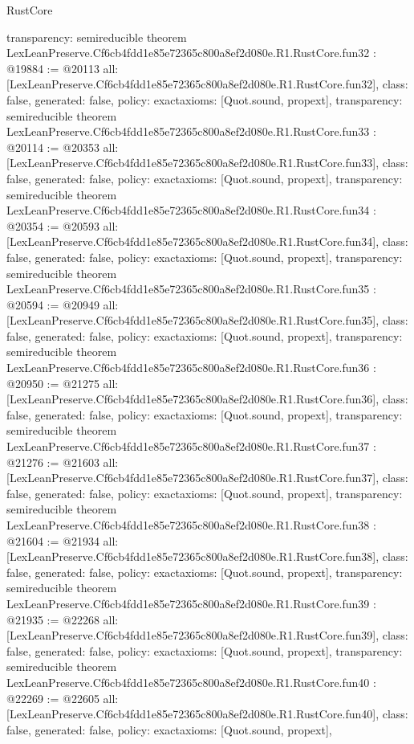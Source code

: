\begin{lexlean}{RustCore}
\begin{coremodule}
{  transparency: semireducible
}
theorem LexLeanPreserve.Cf6cb4fdd1e85e72365c800a8ef2d080e.R1.RustCore.fun32 : @19884 := @20113 {
  all: [LexLeanPreserve.Cf6cb4fdd1e85e72365c800a8ef2d080e.R1.RustCore.fun32],
  class: false,
  generated: false,
  policy: exact{axioms: [Quot.sound, propext]},
  transparency: semireducible
}
theorem LexLeanPreserve.Cf6cb4fdd1e85e72365c800a8ef2d080e.R1.RustCore.fun33 : @20114 := @20353 {
  all: [LexLeanPreserve.Cf6cb4fdd1e85e72365c800a8ef2d080e.R1.RustCore.fun33],
  class: false,
  generated: false,
  policy: exact{axioms: [Quot.sound, propext]},
  transparency: semireducible
}
theorem LexLeanPreserve.Cf6cb4fdd1e85e72365c800a8ef2d080e.R1.RustCore.fun34 : @20354 := @20593 {
  all: [LexLeanPreserve.Cf6cb4fdd1e85e72365c800a8ef2d080e.R1.RustCore.fun34],
  class: false,
  generated: false,
  policy: exact{axioms: [Quot.sound, propext]},
  transparency: semireducible
}
theorem LexLeanPreserve.Cf6cb4fdd1e85e72365c800a8ef2d080e.R1.RustCore.fun35 : @20594 := @20949 {
  all: [LexLeanPreserve.Cf6cb4fdd1e85e72365c800a8ef2d080e.R1.RustCore.fun35],
  class: false,
  generated: false,
  policy: exact{axioms: [Quot.sound, propext]},
  transparency: semireducible
}
theorem LexLeanPreserve.Cf6cb4fdd1e85e72365c800a8ef2d080e.R1.RustCore.fun36 : @20950 := @21275 {
  all: [LexLeanPreserve.Cf6cb4fdd1e85e72365c800a8ef2d080e.R1.RustCore.fun36],
  class: false,
  generated: false,
  policy: exact{axioms: [Quot.sound, propext]},
  transparency: semireducible
}
theorem LexLeanPreserve.Cf6cb4fdd1e85e72365c800a8ef2d080e.R1.RustCore.fun37 : @21276 := @21603 {
  all: [LexLeanPreserve.Cf6cb4fdd1e85e72365c800a8ef2d080e.R1.RustCore.fun37],
  class: false,
  generated: false,
  policy: exact{axioms: [Quot.sound, propext]},
  transparency: semireducible
}
theorem LexLeanPreserve.Cf6cb4fdd1e85e72365c800a8ef2d080e.R1.RustCore.fun38 : @21604 := @21934 {
  all: [LexLeanPreserve.Cf6cb4fdd1e85e72365c800a8ef2d080e.R1.RustCore.fun38],
  class: false,
  generated: false,
  policy: exact{axioms: [Quot.sound, propext]},
  transparency: semireducible
}
theorem LexLeanPreserve.Cf6cb4fdd1e85e72365c800a8ef2d080e.R1.RustCore.fun39 : @21935 := @22268 {
  all: [LexLeanPreserve.Cf6cb4fdd1e85e72365c800a8ef2d080e.R1.RustCore.fun39],
  class: false,
  generated: false,
  policy: exact{axioms: [Quot.sound, propext]},
  transparency: semireducible
}
theorem LexLeanPreserve.Cf6cb4fdd1e85e72365c800a8ef2d080e.R1.RustCore.fun40 : @22269 := @22605 {
  all: [LexLeanPreserve.Cf6cb4fdd1e85e72365c800a8ef2d080e.R1.RustCore.fun40],
  class: false,
  generated: false,
  policy: exact{axioms: [Quot.sound, propext]},
}
\end{coremodule}
\end{lexlean}
